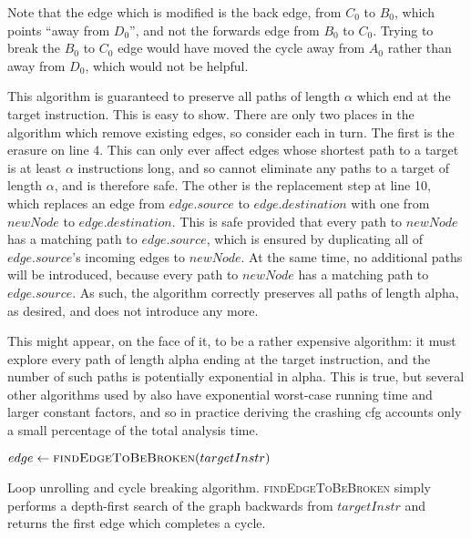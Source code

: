 Note that the edge which is modified is the back edge, from $C_0$ to
$B_0$, which points ``away from $D_0$'', and not the forwards edge
from $B_0$ to $C_0$.  Trying to break the $B_0$ to $C_0$ edge would
have moved the cycle away from $A_0$ rather than away from $D_0$,
which would not be helpful.

This algorithm is guaranteed to preserve all paths of length $\alpha$
which end at the target instruction.  This is easy to show.  There are
only two places in the algorithm which remove existing edges, so
consider each in turn.  The first is the erasure on line 4.  This can
only ever affect edges whose shortest path to a target is at least
$\alpha$ instructions long, and so cannot eliminate any paths to a
target of length $\alpha$, and is therefore safe.  The other is the
replacement step at line 10, which replaces an edge from $edge.source$
to $edge.destination$ with one from $newNode$ to $edge.destination$.
This is safe provided that every path to $newNode$ has a matching path
to $edge.source$, which is ensured by duplicating all of
$edge.source$'s incoming edges to $newNode$.  At the same time, no
additional paths will be introduced, because every path to $newNode$
has a matching path to $edge.source$.  As such, the algorithm
correctly preserves all paths of length \gls{alpha}, as desired, and
does not introduce any more.

This might appear, on the face of it, to be a rather expensive
algorithm: it must explore every path of length \gls{alpha} ending at
the target instruction, and the number of such paths is potentially
exponential in \gls{alpha}.  This is true, but several other
algorithms used by {\implementation} also have exponential worst-case
running time and larger constant factors, and so in practice deriving
the crashing \gls{cfg} accounts only a small percentage of the total
analysis time.

\begin{sanefig}
\begin{algorithmic}[1]
     \State $edge \gets \textsc{findEdgeToBeBroken}(targetInstr)$
     \Else
        \EndFor
     \EndIf
  \EndWhile
\end{algorithmic}
\caption{Loop unrolling and cycle breaking algorithm.
  \textsc{findEdgeToBeBroken} simply performs a depth-first search of
  the graph backwards from $targetInstr$ and returns the first edge
  which completes a cycle.}
\label{fig:derive:read:unroll_cycle_break}
\end{sanefig}

